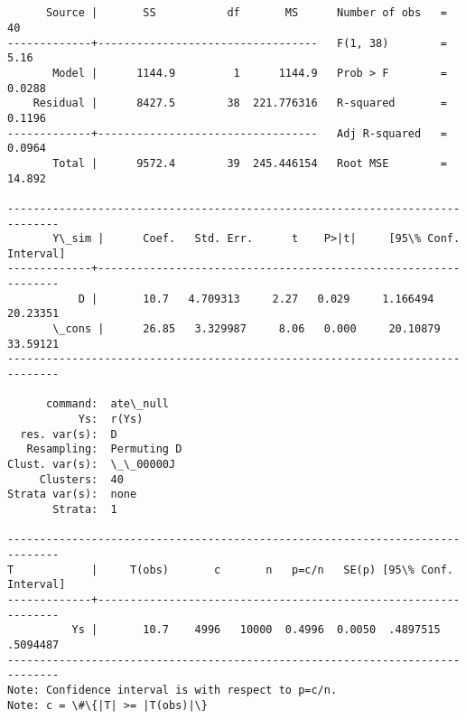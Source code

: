\documentclass[11pt]{article}
\begin{document}
    \begin{Verbatim}[commandchars=\\\{\}]


      Source |       SS           df       MS      Number of obs   =        40
-------------+----------------------------------   F(1, 38)        =      5.16
       Model |      1144.9         1      1144.9   Prob > F        =    0.0288
    Residual |      8427.5        38  221.776316   R-squared       =    0.1196
-------------+----------------------------------   Adj R-squared   =    0.0964
       Total |      9572.4        39  245.446154   Root MSE        =    14.892

------------------------------------------------------------------------------
       Y\_sim |      Coef.   Std. Err.      t    P>|t|     [95\% Conf. Interval]
-------------+----------------------------------------------------------------
           D |       10.7   4.709313     2.27   0.029     1.166494    20.23351
       \_cons |      26.85   3.329987     8.06   0.000     20.10879    33.59121
------------------------------------------------------------------------------

      command:  ate\_null
           Ys:  r(Ys)
  res. var(s):  D
   Resampling:  Permuting D
Clust. var(s):  \_\_00000J
     Clusters:  40
Strata var(s):  none
       Strata:  1

------------------------------------------------------------------------------
T            |     T(obs)       c       n   p=c/n   SE(p) [95\% Conf. Interval]
-------------+----------------------------------------------------------------
          Ys |       10.7    4996   10000  0.4996  0.0050  .4897515   .5094487
------------------------------------------------------------------------------
Note: Confidence interval is with respect to p=c/n.
Note: c = \#\{|T| >= |T(obs)|\}

    \end{Verbatim}
\end{document}
